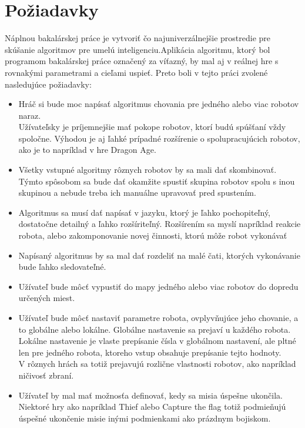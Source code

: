\section{ Požiadavky }\label{poziadavky}
Náplnou bakalárskej práce je vytvoriť čo najuniverzálnejšie prostredie pre skúšanie algoritmov pre umelú inteligenciu.Aplikácia algoritmu, ktorý bol programom bakalárskej práce označený za víťazný, by mal aj v reálnej hre s rovnakými parametrami a cieľami uspieť. Preto  boli  v tejto práci zvolené nasledujúce požiadavky:
\begin {itemize}
\item Hráč si bude moc napísať algoritmus chovania pre jedného alebo viac robotov naraz. \\
	Užívateľsky je príjemnejšie mať pokope robotov, ktorí budú spúšťaní vždy spoločne. Výhodou je aj ľahké prípadné rozšírenie o spolupracujúcich robotov, ako je to napríklad v hre Dragon Age.
\item Všetky vstupné algoritmy rôznych robotov by sa mali dať skombinovať.
	\\Týmto spôsobom sa bude dať okamžite spustiť skupina robotov spolu s inou skupinou a nebude treba ich manuálne upravovať pred spustením.
\item Algoritmus sa musí dať napísať v jazyku, ktorý je ľahko pochopiteľný, dostatočne detailný a ľahko rozšíriteľný.
	Rozšírením sa myslí napríklad reakcie robota, alebo zakomponovanie novej činnosti, ktorú môže robot vykonávať
\item Napísaný algoritmus by sa mal dať rozdeliť na malé čati, ktorých vykonávanie bude ľahko sledovateľné.
\item Užívateľ bude môcť vypustiť do mapy jedného alebo viac robotov do dopredu určených miest.
\item Užívateľ bude môcť nastaviť parametre robota, ovplyvňujúce jeho chovanie, a to globálne alebo lokálne. Globálne nastavenie sa prejaví u každého robota. Lokálne nastavenie je vlaste prepísanie čísla v globálnom nastavení, ale pltné len pre jedného robota, ktoreho vstup obsahuje prepísanie tejto hodnoty.\\
	V rôznych hrách sa totiž prejavujú rozlične vlastnosti robotov, ako napríklad ničivosť zbraní.
\item Užívateľ by mal mať možnosťa definovať, kedy sa misia úspešne ukončila. \\
	Niektoré hry ako napríklad Thief alebo Capture the flag totiž podmieňujú úspešné ukončenie misie inými podmienkami ako prázdnym bojiskom.\\

\end{itemize}
